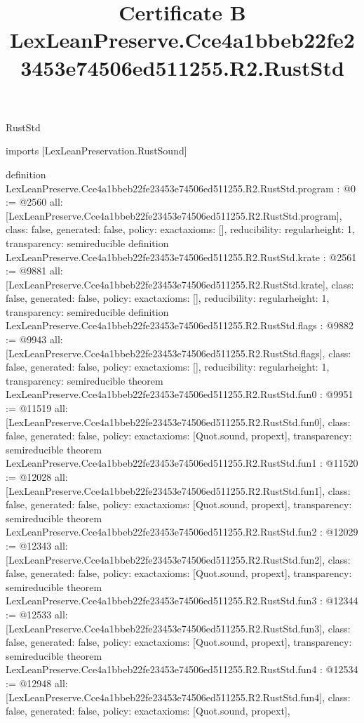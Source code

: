 \begin{lexlean}{RustStd}
\title{Certificate B LexLeanPreserve.Cce4a1bbeb22fe23453e74506ed511255.R2.RustStd}
\begin{coremodule}
imports [LexLeanPreservation.RustSound]

definition LexLeanPreserve.Cce4a1bbeb22fe23453e74506ed511255.R2.RustStd.program : @0 := @2560 {
  all: [LexLeanPreserve.Cce4a1bbeb22fe23453e74506ed511255.R2.RustStd.program],
  class: false,
  generated: false,
  policy: exact{axioms: []},
  reducibility: regular{height: 1},
  transparency: semireducible
}
definition LexLeanPreserve.Cce4a1bbeb22fe23453e74506ed511255.R2.RustStd.krate : @2561 := @9881 {
  all: [LexLeanPreserve.Cce4a1bbeb22fe23453e74506ed511255.R2.RustStd.krate],
  class: false,
  generated: false,
  policy: exact{axioms: []},
  reducibility: regular{height: 1},
  transparency: semireducible
}
definition LexLeanPreserve.Cce4a1bbeb22fe23453e74506ed511255.R2.RustStd.flags : @9882 := @9943 {
  all: [LexLeanPreserve.Cce4a1bbeb22fe23453e74506ed511255.R2.RustStd.flags],
  class: false,
  generated: false,
  policy: exact{axioms: []},
  reducibility: regular{height: 1},
  transparency: semireducible
}
theorem LexLeanPreserve.Cce4a1bbeb22fe23453e74506ed511255.R2.RustStd.fun0 : @9951 := @11519 {
  all: [LexLeanPreserve.Cce4a1bbeb22fe23453e74506ed511255.R2.RustStd.fun0],
  class: false,
  generated: false,
  policy: exact{axioms: [Quot.sound, propext]},
  transparency: semireducible
}
theorem LexLeanPreserve.Cce4a1bbeb22fe23453e74506ed511255.R2.RustStd.fun1 : @11520 := @12028 {
  all: [LexLeanPreserve.Cce4a1bbeb22fe23453e74506ed511255.R2.RustStd.fun1],
  class: false,
  generated: false,
  policy: exact{axioms: [Quot.sound, propext]},
  transparency: semireducible
}
theorem LexLeanPreserve.Cce4a1bbeb22fe23453e74506ed511255.R2.RustStd.fun2 : @12029 := @12343 {
  all: [LexLeanPreserve.Cce4a1bbeb22fe23453e74506ed511255.R2.RustStd.fun2],
  class: false,
  generated: false,
  policy: exact{axioms: [Quot.sound, propext]},
  transparency: semireducible
}
theorem LexLeanPreserve.Cce4a1bbeb22fe23453e74506ed511255.R2.RustStd.fun3 : @12344 := @12533 {
  all: [LexLeanPreserve.Cce4a1bbeb22fe23453e74506ed511255.R2.RustStd.fun3],
  class: false,
  generated: false,
  policy: exact{axioms: [Quot.sound, propext]},
  transparency: semireducible
}
theorem LexLeanPreserve.Cce4a1bbeb22fe23453e74506ed511255.R2.RustStd.fun4 : @12534 := @12948 {
  all: [LexLeanPreserve.Cce4a1bbeb22fe23453e74506ed511255.R2.RustStd.fun4],
  class: false,
  generated: false,
  policy: exact{axioms: [Quot.sound, propext]},
}
\end{coremodule}
\end{lexlean}
